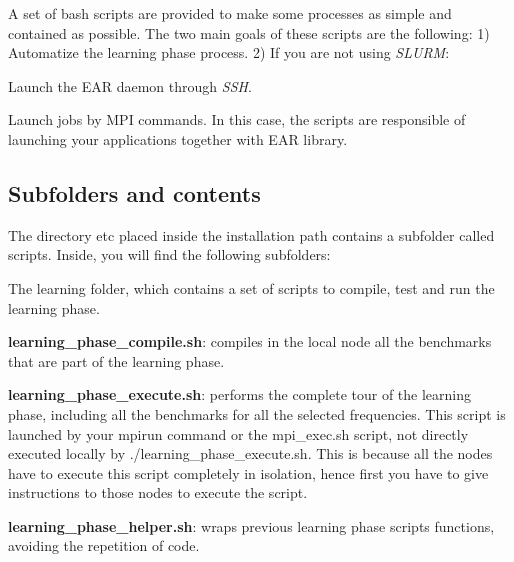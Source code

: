 A set of bash scripts are provided to make some processes as simple and contained as possible. The two main goals of these scripts are the following\+: 1) Automatize the learning phase process. 2) If you are not using {\itshape S\+L\+U\+RM}\+:
\begin{DoxyItemize}
\item Launch the E\+AR daemon through {\itshape S\+SH}.
\item Launch jobs by M\+PI commands. In this case, the scripts are responsible of launching your applications together with E\+AR library.
\end{DoxyItemize}

\subsection*{Subfolders and contents }

The directory {\ttfamily etc} placed inside the installation path contains a subfolder called {\ttfamily scripts}. Inside, you will find the following subfolders\+:

The {\ttfamily learning} folder, which contains a set of scripts to compile, test and run the learning phase.
\begin{DoxyItemize}
\item {\bfseries learning\+\_\+phase\+\_\+compile.\+sh}\+: compiles in the local node all the benchmarks that are part of the learning phase.
\item {\bfseries learning\+\_\+phase\+\_\+execute.\+sh}\+: performs the complete tour of the learning phase, including all the benchmarks for all the selected frequencies. This script is launched by your {\ttfamily mpirun} command or the {\ttfamily mpi\+\_\+exec.\+sh} script, not directly executed locally by {\ttfamily ./learning\+\_\+phase\+\_\+execute.sh}. This is because all the nodes have to execute this script completely in isolation, hence first you have to give instructions to those nodes to execute the script.
\item {\bfseries learning\+\_\+phase\+\_\+helper.\+sh}\+: wraps previous learning phase scripts functions, avoiding the repetition of code.
\end{DoxyItemize}

